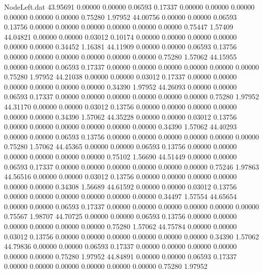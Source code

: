 \begin{filecontents}{NodeLeft.dat}
  43.95691    0.00000    0.00000     0.06593    0.17337    0.00000    0.00000    0.00000    0.00000    0.00000    0.00000    0.75280    1.97952
  44.00756    0.00000    0.00000     0.06593    0.13756    0.00000    0.00000    0.00000    0.00000    0.00000    0.00000    0.75447    1.57409
  44.04821    0.00000    0.00000     0.03012    0.10174    0.00000    0.00000    0.00000    0.00000    0.00000    0.00000    0.34452    1.16381
  44.11909    0.00000    0.00000     0.06593    0.13756    0.00000    0.00000    0.00000    0.00000    0.00000    0.00000    0.75280    1.57062
  44.15955    0.00000    0.00000     0.06593    0.17337    0.00000    0.00000    0.00000    0.00000    0.00000    0.00000    0.75280    1.97952
  44.21038    0.00000    0.00000     0.03012    0.17337    0.00000    0.00000    0.00000    0.00000    0.00000    0.00000    0.34390    1.97952
  44.26093    0.00000    0.00000     0.06593    0.17337    0.00000    0.00000    0.00000    0.00000    0.00000    0.00000    0.75280    1.97952
  44.31170    0.00000    0.00000     0.03012    0.13756    0.00000    0.00000    0.00000    0.00000    0.00000    0.00000    0.34390    1.57062
  44.35228    0.00000    0.00000     0.03012    0.13756    0.00000    0.00000    0.00000    0.00000    0.00000    0.00000    0.34390    1.57062
  44.40293    0.00000    0.00000     0.06593    0.13756    0.00000    0.00000    0.00000    0.00000    0.00000    0.00000    0.75280    1.57062
  44.45365    0.00000    0.00000     0.06593    0.13756    0.00000    0.00000    0.00000    0.00000    0.00000    0.00000    0.75102    1.56690
  44.51449    0.00000    0.00000     0.06593    0.17337    0.00000    0.00000    0.00000    0.00000    0.00000    0.00000    0.75246    1.97863
  44.56516    0.00000    0.00000     0.03012    0.13756    0.00000    0.00000    0.00000    0.00000    0.00000    0.00000    0.34308    1.56689
  44.61592    0.00000    0.00000     0.03012    0.13756    0.00000    0.00000    0.00000    0.00000    0.00000    0.00000    0.34497    1.57554
  44.65654    0.00000    0.00000     0.06593    0.17337    0.00000    0.00000    0.00000    0.00000    0.00000    0.00000    0.75567    1.98707
  44.70725    0.00000    0.00000     0.06593    0.13756    0.00000    0.00000    0.00000    0.00000    0.00000    0.00000    0.75280    1.57062
  44.75784    0.00000    0.00000     0.03012    0.13756    0.00000    0.00000    0.00000    0.00000    0.00000    0.00000    0.34390    1.57062
  44.79836    0.00000    0.00000     0.06593    0.17337    0.00000    0.00000    0.00000    0.00000    0.00000    0.00000    0.75280    1.97952
  44.84891    0.00000    0.00000     0.06593    0.17337    0.00000    0.00000    0.00000    0.00000    0.00000    0.00000    0.75280    1.97952

\end{filecontents}
